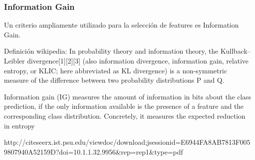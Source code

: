 \subsubsection{Information Gain}
Un criterio ampliamente utilizado para la selección de features es Information Gain.

Definición wikipedia:
In probability theory and information theory, the Kullback–Leibler divergence[1][2][3] (also information divergence, information gain, relative entropy, or KLIC; here abbreviated as KL divergence) is a non-symmetric measure of the difference between two probability distributions P and Q.

\citet{infgain}
Information gain (IG) measures the amount of information in bits about the
class prediction, if the only information available is the presence of a feature
and the corresponding class distribution. Concretely, it measures the expected
reduction in entropy

http://citeseerx.ist.psu.edu/viewdoc/download;jsessionid=E6944FA8AB7813F0059807940A52159D?doi=10.1.1.32.9956&rep=rep1&type=pdf